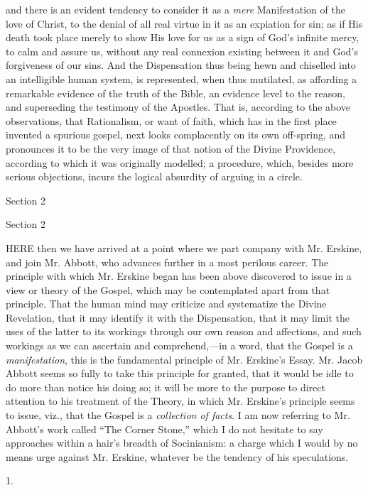 and there is an evident tendency to consider it as a \emph{mere}
Manifestation of the love of Christ, to the denial of all real virtue
in it as an expiation for sin; as if His death took place merely to
show His love for us as a sign of God's infinite mercy, to calm and
assure us, without any real connexion existing between it and God's
forgiveness of our sins. And the Dispensation thus being hewn and
chiselled into an intelligible human system, is represented, when thus
mutilated, as affording a remarkable evidence of the truth of the
Bible, an evidence level to the reason, and superseding the testimony
of the Apostles. That is, according to the above observations, that
Rationalism, or want of faith, which has in the first place invented a
spurious gospel, next looks complacently on its own off-spring, and
pronounces it to be the very image of that notion of the Divine
Providence, according to which it was originally modelled; a
procedure, which, besides more serious objections, incurs the logical
absurdity of arguing in a circle.

Section 2


Section 2

HERE
then we have arrived at a point where we part company with Mr. Erskine,
and join Mr. Abbott, who advances further in a most perilous career.
The principle with which Mr. Erskine began has been above discovered
to issue in a view or theory of the Gospel, which may be contemplated
apart from that principle. That the human mind may criticize and
systematize the Divine Revelation, that it may identify it with the
Dispensation, that it may limit the uses of the latter to its workings
through our own reason and affections, and such workings as we can
ascertain and comprehend,—in a word, that the Gospel is a \emph{manifestation}, this
is the fundamental principle of Mr. Erskine's Essay. Mr. Jacob
Abbott seems so fully to take this principle for granted, that it
would be idle to do more than notice his doing so; it will be more to
the purpose to direct attention to his treatment of the Theory, in
which Mr. Erskine's principle seems to issue, viz., that the Gospel
is a \emph{collection of facts}. I am now referring to Mr. Abbott's work called ``The Corner
Stone,'' which I do not hesitate to say approaches within a hair's
breadth of Socinianism: a charge which I would by no means urge
against Mr. Erskine, whatever be the tendency of his speculations.

1.

